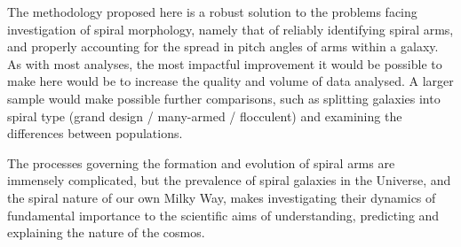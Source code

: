 The methodology proposed here is a robust solution to the problems facing investigation of spiral morphology, namely that of reliably identifying spiral arms, and properly accounting for the spread in pitch angles of arms within a galaxy. As with most analyses, the most impactful improvement it would be possible to make here would be to increase the quality and volume of data analysed. A larger sample would make possible further comparisons, such as splitting galaxies into spiral type (grand design / many-armed / flocculent) and examining the differences between populations.

The processes governing the formation and evolution of spiral arms are immensely complicated, but the prevalence of spiral galaxies in the Universe, and the spiral nature of our own Milky Way, makes investigating their dynamics of fundamental importance to the scientific aims of understanding, predicting and explaining the nature of the cosmos.

